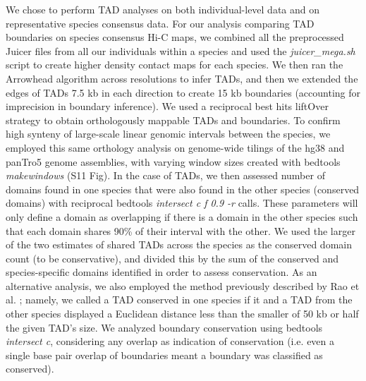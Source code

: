 We chose to perform TAD analyses on both individual-level data and on representative species consensus data. For our analysis comparing TAD boundaries on species consensus Hi-C maps, we combined all the preprocessed Juicer files from all our individuals within a species and used the \textit{juicer\_mega.sh} script \cite{Durand.2016} to create higher density contact maps for each species. We then ran the Arrowhead algorithm across resolutions to infer TADs, and then we extended the edges of TADs 7.5 kb in each direction to create 15 kb boundaries (accounting for imprecision in boundary inference). We used a reciprocal best hits liftOver strategy \cite{Ward.2014, Kent.2002} to obtain orthologously mappable TADs and boundaries. To confirm high synteny of large-scale linear genomic intervals between the species, we employed this same orthology analysis on genome-wide tilings of the hg38 and panTro5 genome assemblies, with varying window sizes created with bedtools \cite{Quinlan.2010} \textit{makewindows} (S11 Fig). In the case of TADs, we then assessed number of domains found in one species that were also found in the other species (conserved domains) with reciprocal bedtools \cite{Quinlan.2010} \textit{intersect {\textendash}c {\textendash}f 0.9 -r} calls. These parameters will only define a domain as overlapping if there is a domain in the other species such that each domain shares 90\% of their interval with the other. We used the larger of the two estimates of shared TADs across the species as the conserved domain count (to be conservative), and divided this by the sum of the conserved and species-specific domains identified in order to assess conservation. As an alternative analysis, we also employed the method previously described by Rao et al. \cite{Rao.2014}; namely, we called a TAD conserved in one species if it and a TAD from the other species displayed a Euclidean distance less than the smaller of 50 kb or half the given TAD's size. We analyzed boundary conservation using bedtools \textit{intersect {\textendash}c}, considering any overlap as indication of conservation (i.e. even a single base pair overlap of boundaries meant a boundary was classified as conserved).

